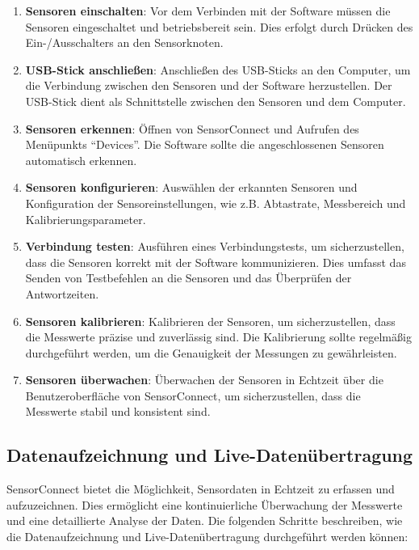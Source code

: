 \begin{enumerate}
    \item \textbf{Sensoren einschalten}: Vor dem Verbinden mit der Software müssen die Sensoren eingeschaltet und betriebsbereit sein. Dies erfolgt durch Drücken des Ein-/Ausschalters an den Sensorknoten.
    \item \textbf{USB-Stick anschließen}: Anschließen des USB-Sticks an den Computer, um die Verbindung zwischen den Sensoren und der Software herzustellen. Der USB-Stick dient als Schnittstelle zwischen den Sensoren und dem Computer.
    \item \textbf{Sensoren erkennen}: Öffnen von SensorConnect und Aufrufen des Menüpunkts ``Devices''. Die Software sollte die angeschlossenen Sensoren automatisch erkennen.
    \item \textbf{Sensoren konfigurieren}: Auswählen der erkannten Sensoren und Konfiguration der Sensoreinstellungen, wie z.B. Abtastrate, Messbereich und Kalibrierungsparameter.
    \item \textbf{Verbindung testen}: Ausführen eines Verbindungstests, um sicherzustellen, dass die Sensoren korrekt mit der Software kommunizieren. Dies umfasst das Senden von Testbefehlen an die Sensoren und das Überprüfen der Antwortzeiten.
    \item \textbf{Sensoren kalibrieren}: Kalibrieren der Sensoren, um sicherzustellen, dass die Messwerte präzise und zuverlässig sind. Die Kalibrierung sollte regelmäßig durchgeführt werden, um die Genauigkeit der Messungen zu gewährleisten.
    \item \textbf{Sensoren überwachen}: Überwachen der Sensoren in Echtzeit über die Benutzeroberfläche von SensorConnect, um sicherzustellen, dass die Messwerte stabil und konsistent sind.
\end{enumerate}

\subsection{Datenaufzeichnung und Live-Datenübertragung}
SensorConnect bietet die Möglichkeit, Sensordaten in Echtzeit zu erfassen und aufzuzeichnen. Dies ermöglicht eine kontinuierliche Überwachung der Messwerte und eine detaillierte Analyse der Daten. Die folgenden Schritte beschreiben, wie die Datenaufzeichnung und Live-Datenübertragung durchgeführt werden können:

